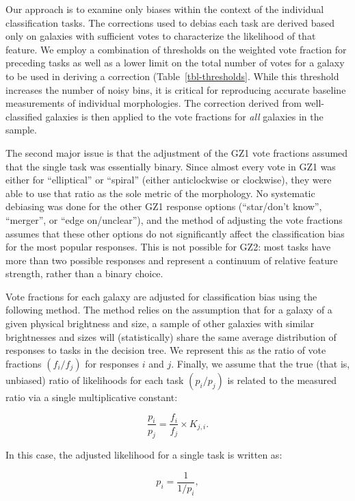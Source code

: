 \documentclass[useAMS,usenatbib]{mn2e}
\begin{document}
Our approach is to examine only biases within the context of the individual classification tasks. The corrections used to debias each task are derived based only on galaxies with sufficient votes to characterize the likelihood of that feature. We employ a combination of thresholds on the weighted vote fraction for preceding tasks as well as a lower limit on the total number of votes for a galaxy to be used in deriving a correction (Table~\ref{tbl-thresholds}. While this threshold increases the number of noisy bins, it is critical for reproducing accurate baseline measurements of individual morphologies. The correction derived from well-classified galaxies is then applied to the vote fractions for {\em all} galaxies in the sample. 

The second major issue is that the adjustment of the GZ1 vote fractions assumed that the single task was essentially binary. Since almost every vote in GZ1 was either for ``elliptical'' or ``spiral'' (either anticlockwise or clockwise), they were able to use that ratio as the sole metric of the morphology. No systematic debiasing was done for the other GZ1 response options (``star/don't know'', ``merger'', or ``edge on/unclear''), and the method of adjusting the vote fractions assumes that these other options do not significantly affect the classification bias for the most popular responses. This is not possible for GZ2: most tasks have more than two possible responses and represent a continuum of relative feature strength, rather than a binary choice.

Vote fractions for each galaxy are adjusted for classification bias using the following method. The method relies on the assumption that for a galaxy of a given physical brightness and size, a sample of other galaxies with similar brightnesses and sizes will (statistically) share the same average distribution of responses to tasks in the decision tree. We represent this as the ratio of vote fractions $(f_i/f_j)$ for responses $i$ and $j$. Finally, we assume that the true (that is, unbiased) ratio of likelihoods for each task $(p_i/p_j)$ is related to the measured ratio via a single multiplicative constant:

\begin{equation}
\frac{p_i}{p_j} = \frac{f_i}{f_j}\times K_{j,i}.
\label{eqn-kdef}
\end{equation}

\noindent In this case, the adjusted likelihood for a single task is written as:

\begin{equation}
p_i = \frac{1}{1/p_i},
\label{eqn-adjprob1}
\end{equation}
\end{document}

